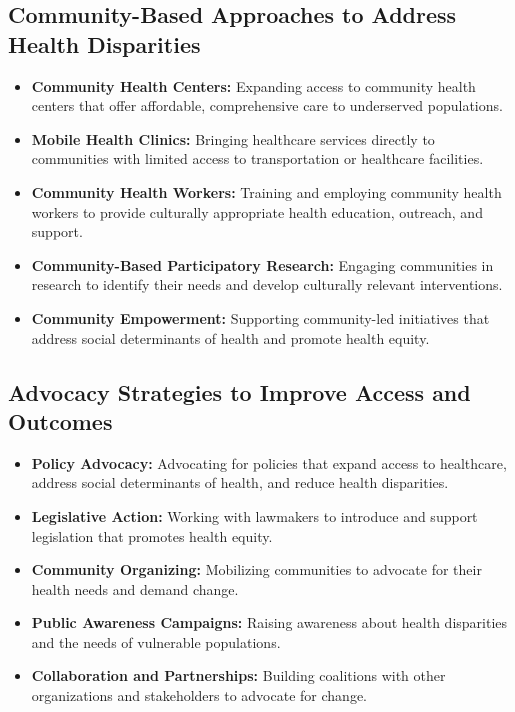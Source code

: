 \documentclass[12pt,a4paper]{article}
\begin{document}
\subsection*{Community-Based Approaches to Address Health Disparities}
\begin{itemize}
    \item \textbf{Community Health Centers:} Expanding access to community health centers that offer affordable, comprehensive care to underserved populations.
    \item \textbf{Mobile Health Clinics:} Bringing healthcare services directly to communities with limited access to transportation or healthcare facilities.
    \item \textbf{Community Health Workers:} Training and employing community health workers to provide culturally appropriate health education, outreach, and support.
    \item \textbf{Community-Based Participatory Research:} Engaging communities in research to identify their needs and develop culturally relevant interventions.
    \item \textbf{Community Empowerment:} Supporting community-led initiatives that address social determinants of health and promote health equity.
\end{itemize}

\subsection*{Advocacy Strategies to Improve Access and Outcomes}
\begin{itemize}
    \item \textbf{Policy Advocacy:} Advocating for policies that expand access to healthcare, address social determinants of health, and reduce health disparities.
    \item \textbf{Legislative Action:} Working with lawmakers to introduce and support legislation that promotes health equity.
    \item \textbf{Community Organizing:} Mobilizing communities to advocate for their health needs and demand change.
    \item \textbf{Public Awareness Campaigns:} Raising awareness about health disparities and the needs of vulnerable populations.
    \item \textbf{Collaboration and Partnerships:} Building coalitions with other organizations and stakeholders to advocate for change.
\end{itemize}
\end{document}
